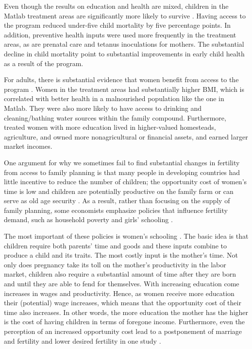 \documentclass[letterpaper,12pt]{article}
\begin{document}
Even though the results on education and health are mixed, children in
the Matlab treatment areas are significantly more likely to survive
\citep{Joshi2007}. 
Having access to the program reduced under-five child mortality by five
percentage points. 
In addition, preventive health inputs were used more frequently in the
treatment areas, as are prenatal care and tetanus inoculations for
mothers. 
The substantial decline in child mortality point to substantial
improvements in early child health as a result of the program.

For adults, there is substantial evidence that women benefit from access
to the program \citep{Joshi2007}. 
Women in the treatment areas had substantially higher BMI, which is
correlated with better health in a malnourished population like the one
in Matlab. 
They were also more likely to have access to drinking and
cleaning/bathing water sources within the family compound. 
Furthermore, treated women with more education lived in higher-valued
homesteads, agriculture, and owned more nonagricultural or financial
assets, and earned larger market incomes.

One argument for why we sometimes fail to find substantial changes in
fertility from access to family planning is that many people in
developing countries had little incentive to reduce the number of
children; the opportunity cost of women's time is low and children are
potentially productive on the family farm or can serve as old age
security \citep{Banerjee2014,Lambert2016}. 
As a result, rather than focusing on the supply of family planning, some
economists emphasize policies that influence fertility demand, such as
household poverty and girls' schooling
\citep{pritchett94a,DasGupta2011}.

The most important of these policies is women's schooling
\citep{schultz02}. 
The basic idea is that children require both parents' time and goods and
these inputs combine to produce a child and its traits. 
The most costly input is the mother's time. 
Not only does pregnancy take its toll on the mother's productivity in
the labor market, children also require a substantial amount of time
after they are born and until they are able to fend for themselves. 
With increasing education come increases in wages and productivity. 
Hence, as women receive more education their (potential) wage increases,
which means that the opportunity cost of their time also increases. 
In other words, the more education the mother has the higher is the cost
of having children in terms of foregone income. 
Furthermore, even the perception of an increased opportunity cost lead
to a postponement of marriage and fertility and lower desired fertility
in one study \citep{Jensen2012}.
\end{document}

